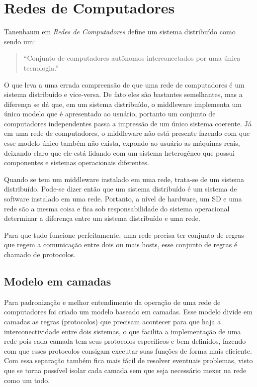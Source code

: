 \section{Redes de Computadores}
    Tanenbaum em \textit{Redes de Computadores} define um sistema distribuído como sendo um: %

    \begin{quote}
        ``Conjunto de computadores autônomos interconectados por uma única tecnologia.''
     \end{quote}

    O que leva a uma errada compreensão de que uma rede de computadores é um sistema distribuído e vice-versa. De fato eles são bastantes semelhantes, mas a diferença se dá que, em um sistema distribuído, o middleware implementa um único modelo que é apresentado ao usuário, portanto um conjunto de computadores independentes passa a impressão de um único sistema coerente. Já em uma rede de computadores, o middleware não está presente fazendo com que esse modelo único também não exista, expondo ao usuário as máquinas reais, deixando claro que ele está lidando com um sistema heterogêneo que possui componentes e sistemas operacionais diferentes.

    Quando se tem um middleware instalado em uma rede, trata-se de um sistema distribuído. Pode-se dizer então que um sistema distribuído é um sistema de software instalado em uma rede. Portanto, a nível de hardware, um SD e uma rede são a mesma coisa e fica sob responsabilidade do sistema operacional determinar a diferença entre um sistema distribuído e uma rede.

    Para que tudo funcione perfeitamente, uma rede precisa ter conjunto de regras que regem a comunicação entre dois ou mais hosts, esse conjunto de regras é chamado de protocolos.%

    \subsection{Modelo em camadas}
        Para padronização e melhor entendimento da operação de uma rede de computadores foi criado um modelo baseado em camadas. Esse modelo divide em camadas as regras (protocolos) que precisam acontecer para que haja a interconectividade entre dois sistemas, o que facilita a implementação de uma rede pois cada camada tem seus protocolos específicos e bem definidos, fazendo com que esses protocolos consigam executar suas funções de forma mais eficiente. Com essa separação também fica mais fácil de resolver eventuais problemas, visto que se torna possível isolar cada camada sem que seja necessário mexer na rede como um todo.

